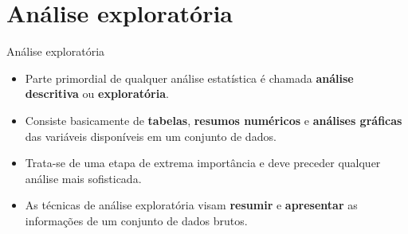 \documentclass[
  ignorenonframetext,
  serif,
  professionalfont,
  usenames,
  dvipsnames,
  aspectratio = 169]{beamer}
\begin{document}
\section{Análise exploratória}\label{anuxe1lise-exploratuxf3ria}

\begin{frame}{Análise exploratória}
\label{anuxe1lise-exploratuxf3ria-1}
\begin{itemize}
\item
  Parte primordial de qualquer análise estatística é chamada
  \textbf{análise descritiva} ou \textbf{exploratória}.
\item
  Consiste basicamente de \textbf{tabelas}, \textbf{resumos numéricos} e
  \textbf{análises gráficas} das variáveis disponíveis em um conjunto de
  dados.
\item
  Trata-se de uma etapa de extrema importância e deve preceder qualquer
  análise mais sofisticada.
\item
  As técnicas de análise exploratória visam \textbf{resumir} e
  \textbf{apresentar} as informações de um conjunto de dados brutos.
\end{itemize}
\end{frame}
\end{document}
